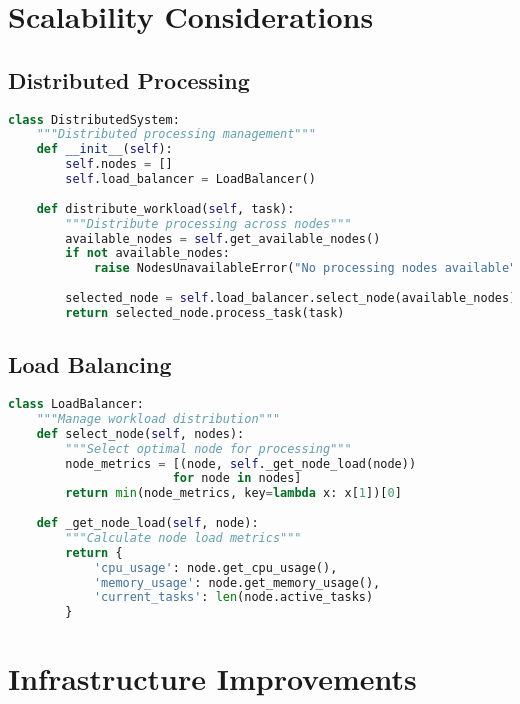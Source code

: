 \section{Scalability Considerations}

\subsection{Distributed Processing}
\begin{lstlisting}[language=Python]
class DistributedSystem:
    """Distributed processing management"""
    def __init__(self):
        self.nodes = []
        self.load_balancer = LoadBalancer()
        
    def distribute_workload(self, task):
        """Distribute processing across nodes"""
        available_nodes = self.get_available_nodes()
        if not available_nodes:
            raise NodesUnavailableError("No processing nodes available")
            
        selected_node = self.load_balancer.select_node(available_nodes)
        return selected_node.process_task(task)
\end{lstlisting}

\subsection{Load Balancing}
\begin{lstlisting}[language=Python]
class LoadBalancer:
    """Manage workload distribution"""
    def select_node(self, nodes):
        """Select optimal node for processing"""
        node_metrics = [(node, self._get_node_load(node)) 
                       for node in nodes]
        return min(node_metrics, key=lambda x: x[1])[0]
        
    def _get_node_load(self, node):
        """Calculate node load metrics"""
        return {
            'cpu_usage': node.get_cpu_usage(),
            'memory_usage': node.get_memory_usage(),
            'current_tasks': len(node.active_tasks)
        }
\end{lstlisting}

\section{Infrastructure Improvements}

